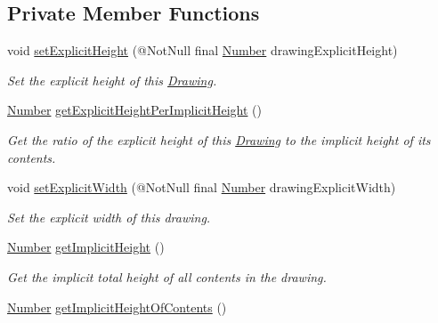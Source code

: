 \subsection*{Private Member Functions}
\begin{DoxyCompactItemize}
\item 
void \hyperlink{classcom_1_1aarrelaakso_1_1drawl_1_1_drawing_a115e6b8aab01c3d54c68af9cdc67ed11}{set\+Explicit\+Height} (@Not\+Null final \hyperlink{interfacecom_1_1aarrelaakso_1_1drawl_1_1_number}{Number} drawing\+Explicit\+Height)
\begin{DoxyCompactList}\small\item\em Set the explicit height of this \hyperlink{classcom_1_1aarrelaakso_1_1drawl_1_1_drawing}{Drawing}. \end{DoxyCompactList}\item 
\hyperlink{interfacecom_1_1aarrelaakso_1_1drawl_1_1_number}{Number} \hyperlink{classcom_1_1aarrelaakso_1_1drawl_1_1_drawing_a7e165d3b122c0fd44404c20c1211c21f}{get\+Explicit\+Height\+Per\+Implicit\+Height} ()
\begin{DoxyCompactList}\small\item\em Get the ratio of the explicit height of this \hyperlink{classcom_1_1aarrelaakso_1_1drawl_1_1_drawing}{Drawing} to the implicit height of its contents. \end{DoxyCompactList}\item 
void \hyperlink{classcom_1_1aarrelaakso_1_1drawl_1_1_drawing_a547eda8e04300947a0e424f62589e5c4}{set\+Explicit\+Width} (@Not\+Null final \hyperlink{interfacecom_1_1aarrelaakso_1_1drawl_1_1_number}{Number} drawing\+Explicit\+Width)
\begin{DoxyCompactList}\small\item\em Set the explicit width of this drawing. \end{DoxyCompactList}\item 
\hyperlink{interfacecom_1_1aarrelaakso_1_1drawl_1_1_number}{Number} \hyperlink{classcom_1_1aarrelaakso_1_1drawl_1_1_drawing_a4caf5eb85285105c951522b0079f17f1}{get\+Implicit\+Height} ()
\begin{DoxyCompactList}\small\item\em Get the implicit total height of all contents in the drawing. \end{DoxyCompactList}\item 
\hyperlink{interfacecom_1_1aarrelaakso_1_1drawl_1_1_number}{Number} \hyperlink{classcom_1_1aarrelaakso_1_1drawl_1_1_drawing_a50786a75c6ca4f30ab752d276a23c1c4}{get\+Implicit\+Height\+Of\+Contents} ()

\end{DoxyCompactItemize}
